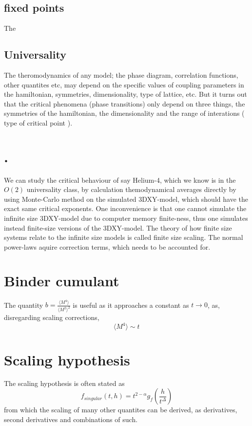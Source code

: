 \documentclass[a4paper]{article}
\begin{document}
\subsection{fixed points}
The 

\subsection{Universality}
The theromodynamics of any model; the phase diagram, correlation functions, other quantites etc, may depend on the specific values of coupling parameters in the hamiltonian, symmetries, dimensionality, type of lattice, etc. 
But it turns out that the critical phenomena (phase transitions) only depend on three things, the symmetries of the hamiltonian, the dimensionality and the range of interations ( type of critical point ).

\section{.}
We can study the critical behaviour of say Helium-4, which we know is in the $O(2)$ universality class, by calculation themodynamical averages directly by using Monte-Carlo method on the simulated 3DXY-model, which should have the exact same critical exponents. 
One inconvenience is that one cannot simulate the infinite size 3DXY-model due to computer memory finite-ness, thus one simulates instead finite-size versions of the 3DXY-model. The theory of how finite size systems relate to the infinite size models is called finite size scaling. The normal power-laws aquire correction terms, which needs to be accounted for.

\section{Binder cumulant}
The quantity $b =\frac{\langle M^4 \rangle}{\langle M^2\rangle^2}$ is useful as it approaches a constant as $t\rightarrow 0 $, as,  disregarding scaling corrections,
\begin{equation}
  \langle M^4 \rangle \sim t^{}
\end{equation}
\section{Scaling hypothesis}
The scaling hypothesis is often stated as
\begin{equation}
  f_{singular}(t,h) = t^{2- \alpha} g_f\left(\frac{h}{t^\Delta}\right)
\end{equation}
from which the scaling of many other quantites can be derived, as derivatives, second derivatives and combinations of such.
\end{document}
